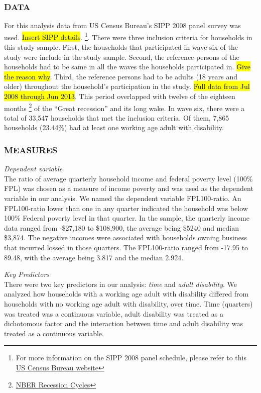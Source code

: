 \documentclass[11pt]{extarticle} %
\begin{document}
\subsubsection*{DATA}
For this analysis data from US Census Bureau's SIPP 2008 panel survey was used. {\hl{Insert SIPP details}}. {\footnote{For more information on the SIPP 2008 panel schedule, please refer to this \href{http://www.census.gov/programs-surveys/sipp/data/2008-panel.html}{US Census Bureau website}}}. There were three inclusion criteria for households in this study sample. First, the households that participated in wave six of the study were include in the study sample. Second, the reference persons of the households had to be same in all the waves the households participated in. {\hl{Give the reason why}}. Third, the reference persons had to be adults (18 years and older) throughout the household's participation in the study. {\hl{Full data from Jul 2008 through Jun 2013}}. This period overlapped with twelve of the eighteen months {\footnote{\href{http://www.nber.org/cycles/}{NBER Recession Cycles}}} of the ``Great recession'' and its long wake. In wave six, there were a total of 33,547 households that met the inclusion criteria. Of them, 7,865  households (23.44\%) had at least one working age adult with disability.

\subsubsection*{MEASURES}
\noindent
{\emph{Dependent variable}}\\
The ratio of average quarterly household income and federal poverty level (100\% FPL) was chosen as a measure of income poverty and was used as the dependent variable in our analysis. We named the dependent variable FPL100-ratio. An FPL100-ratio lower than one in any quarter indicated the household was below 100\% Federal poverty level in that quarter. In the sample, the quarterly income data ranged from -\$27,180 to \$108,900, the average being \$5240 and median \$3,874. The negative incomes were associated with households owning business that incurred lossed in those quarters. The FPL100-ratio ranged from -17.95 to 89.48, with the average being 3.817 and the median 2.924. 

\noindent
{\emph{Key Predictors}}\\
There were two key predictors in our analysis: {\emph{time}} and {\emph{adult disability}}. We analyzed how households with a working age adult with disability differed from households with no working age adult with disability, over time. Time (quarters) was treated was a continuous variable, adult disability was treated as a dichotomous factor and the interaction between time and adult disability was treated as a continuous variable. 
\end{document}
